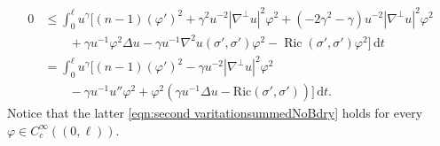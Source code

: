 \documentclass[12pt,a4paper,reqno]{amsart}
\theoremstyle{definition}
\renewcommand{\leq}{\leqslant}
\DeclareMathOperator{\Ric}{Ric}
\newcommand{\D}{\nabla}
\begin{document}
\begin{equation}\label{eqn:second varitationsummedNoBdry}
    \begin{aligned}
    0 &\leq \int_0^\ell u^\gamma\Big[(n-1)(\varphi')^2+{\gamma^2u^{-2}|\D^\perp u|^2\varphi^2}+(-2\gamma^2-\gamma)u^{-2}|\D^\perp u|^2\varphi^2 \\
    &\qquad +\gamma u^{-1}\varphi^2\Delta u-\gamma u^{-1}\D^2 u(\sigma',\sigma')\varphi^2-\Ric(\sigma',\sigma')\varphi^2\Big]\,\mathrm{d}t \\
    &= \int_0^\ell u^\gamma\Big[(n-1)(\varphi')^2-\gamma u^{-2}|\D^\perp u|^2\varphi^2 \\
    &\qquad -\gamma u^{-1}u''\varphi^2+\varphi^2(\gamma u^{-1}\Delta u - \mathrm{Ric}(\sigma',\sigma'))\Big]\,\mathrm{d}t.
\end{aligned}
\end{equation}
Notice that the latter \eqref{eqn:second varitationsummedNoBdry} holds for every $\varphi\in C^\infty_c((0,\ell))$.
\end{document}
